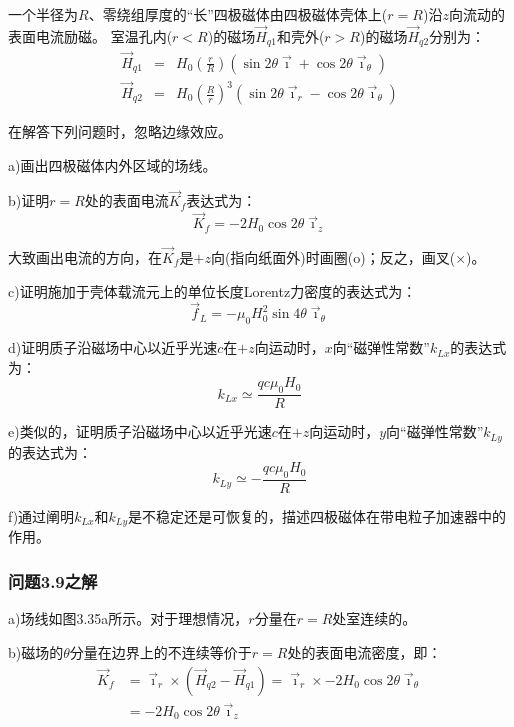 一个半径为$R$、零绕组厚度的“长”四极磁体由四极磁体壳体上($r=R$)沿$z$向流动的表面电流励磁。
室温孔内($r<R$)的磁场$\vec{H}_{q1}$和壳外($r>R$)的磁场$\vec{H}_{q2}$分别为：
\begin{eqnarray}
\vec{H}_{q1}&=&H_{0}\left(\frac{r}{R}\right)(\sin 2\theta\vec{\imath}+\cos 2\theta\vec{\imath}_{\theta})\\%
\vec{H}_{q2}&=&H_{0}\left(\frac{R}{r}\right)^{3}(\sin 2\theta\vec{\imath}_{r}-\cos 2\theta\vec{\imath}_{\theta})%
\end{eqnarray}

在解答下列问题时，忽略边缘效应。

a)画出四极磁体内外区域的场线。 

b)证明$r=R$处的表面电流$\vec{K}_f$表达式为：
\begin{equation}
\vec{K}_{f}=-2H_{0}\cos 2\theta\vec{\imath}_{z}%
\end{equation}

大致画出电流的方向，在$\vec{K}_f$是$+z$向(指向纸面外)时画圈(o)；反之，画叉(×)。

c)证明施加于壳体载流元上的单位长度Lorentz力密度的表达式为：
\begin{equation}
\vec{f}_{L}=-\mu_{0}H_{0}^{2}\sin 4\theta\vec{\imath}_{\theta}%
\end{equation}

d)证明质子沿磁场中心以近乎光速$c$在$+z$向运动时，$x$向“磁弹性常数”$k_{Lx}$的表达式为：
\begin{equation}
k_{Lx}\simeq\frac{qc\mu_{0}H_{0}}{R}%
\end{equation}

e)类似的，证明质子沿磁场中心以近乎光速$c$在$+z$向运动时，$y$向“磁弹性常数”$k_{Ly}$的表达式为：
\begin{equation}
k_{Ly}\simeq-\frac{qc\mu_{0}H_{0}}{R}%
\end{equation}

f)通过阐明$k_{Lx}$和$k_{Ly}$是不稳定还是可恢复的，描述四极磁体在带电粒子加速器中的作用。

\subsubsection{问题3.9之解}
a)场线如图3.35a所示。对于理想情况，$r$分量在$r=R$处室连续的。

b)磁场的$\theta$分量在边界上的不连续等价于$r=R$处的表面电流密度，即：
\begin{equation}
\begin{split}
\vec{K}_{f}&=\vec{\imath}_{r}\times(\vec{H}_{q2}-\vec{H}_{q1})=\vec{\imath}_{r}\times-2H_{0}\cos 2\theta\vec{\imath}_{\theta}\\
&=-2H_{0}\cos 2\theta\vec{\imath}_{z}\\%
\end{split}
\end{equation}

